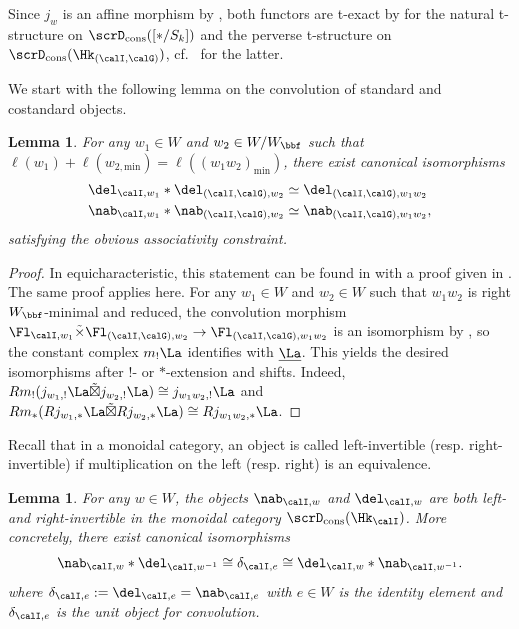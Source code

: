 \documentclass[10pt, reqno]{amsart}
\theoremstyle{plain}
\newtheorem{lemma}[theorem]{Lemma}
\theoremstyle{definition}
\numberwithin{equation}{section}
\begin{document}
	Since $j_w$ is an affine morphism by , both functors are t-exact by \cite[Corollaire 4.1.3]{BBDG18} for the natural t-structure on $\scrD_{\mathrm{cons}}([\ast/S_k])$ and the perverse t-structure on $\scrD_{\mathrm{cons}}(\Hk_{(\calI,\calG)})$, cf.\ \cite[Definition 6.8]{AGLR22} for the latter.
	
	
	We start with the following lemma on the convolution of standard and costandard objects. 
	
	\begin{lemma} \label{djfejkjd;kjkel;}
		For any $w_1\in W$ and $w_2 \in W/W_\bbf$ such that $\ell(w_1)+\ell(w_{2,\mathrm{min}})=\ell((w_1w_2)_{\mathrm{min}})$, there exist canonical isomorphisms
		\begin{align*}
			&  \del_{\calI,w_1}*\del_{(\calI,\calG),w_2}\simeq \del_{(\calI,\calG),w_1w_2}\\
			& \nab_{\calI,w_1}*\nab_{(\calI,\calG),w_2}\simeq \nab_{(\calI,\calG),w_1w_2},
		\end{align*}
		satisfying the obvious associativity constraint.
	\end{lemma}
	
	\begin{proof}
		In equicharacteristic, this statement can be found in \cite[Lemma 8(a)]{AB09} with a proof given in \cite[Lemma 4.1.4 (1),(2)]{AR}. The same proof applies here. For any $w_1 \in W$ and $w_2\in W$ such that $w_1w_2$ is right $W_\bbf$-minimal and reduced, the convolution morphism $\Fl_{\calI, w_1}\tilde{\times}\Fl_{(\calI,\calG), w_2}\rightarrow \Fl_{(\calI,\calG), w_1w_2}$ is an isomorphism by , so the constant complex $m_!\La$ identifies with $\underline{\La}$. This yields the desired isomorphisms after $!$- or $*$-extension and shifts. Indeed, $Rm_!(j_{w_1,!}\La\tilde{\boxtimes} j_{w_2,!}\La)\cong j_{w_1w_2,!}\La$ and $Rm_\ast(Rj_{w_1,\ast}\La\tilde{\boxtimes} Rj_{w_2,\ast}\La)\cong Rj_{w_1w_2,\ast}\La$. 
	\end{proof}
	
	Recall that in a monoidal category, an object is called left-invertible (resp. right-invertible) if multiplication on the left (resp. right) is an equivalence.
	
	\begin{lemma}\label{lem_invertible_conv_stand}
		For any $w\in W$, the objects $\nab_{\calI,w}$ and $\del_{\calI,w}$ are both left- and right-invertible in the monoidal category $\scrD_{\mathrm{cons}}(\Hk_\calI)$. More concretely, there exist canonical isomorphisms
		$$
		\nab_{\calI,w}*\del_{\calI,w^{-1}}\cong \delta_{\calI,e} \cong \del_{\calI,w}*\nab_{\calI,w^{-1}}.
		$$
		where $\delta_{\calI,e} : =\del_{\calI,e} = \nab_{\calI,e} $ with $e \in W$ is the identity element and $\delta_{\calI,e}$ is the unit object for convolution. 
	\end{lemma}
	
\end{document}

